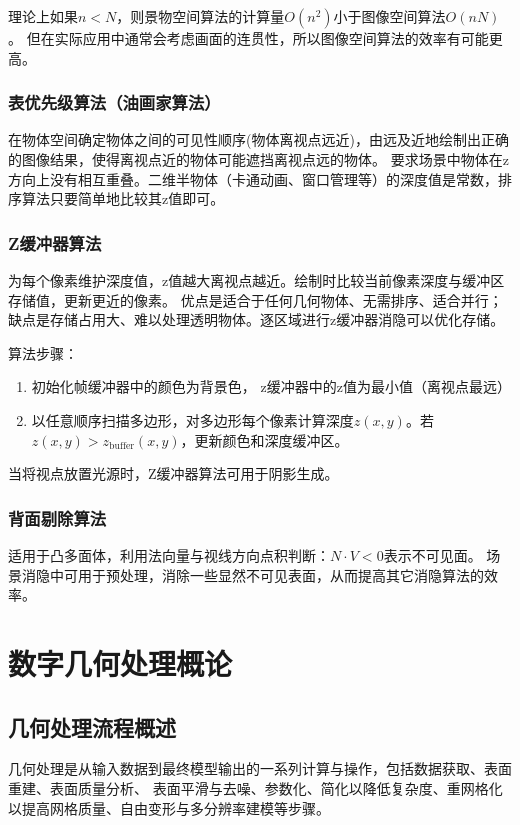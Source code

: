 \documentclass[12pt]{article}
\begin{document}
理论上如果$n<N$，则景物空间算法的计算量$O(n^2)$小于图像空间算法$O(nN)$。
但在实际应用中通常会考虑画面的连贯性，所以图像空间算法的效率有可能更高。

\subsubsection{表优先级算法（油画家算法）}
在物体空间确定物体之间的可见性顺序(物体离视点远近)，由远及近地绘制出正确的图像结果，使得离视点近的物体可能遮挡离视点远的物体。
要求场景中物体在z方向上没有相互重叠。二维半物体（卡通动画、窗口管理等）的深度值是常数，排序算法只要简单地比较其z值即可。

\subsubsection{Z缓冲器算法}
为每个像素维护深度值，z值越大离视点越近。绘制时比较当前像素深度与缓冲区存储值，更新更近的像素。
优点是适合于任何几何物体、无需排序、适合并行；缺点是存储占用大、难以处理透明物体。逐区域进行z缓冲器消隐可以优化存储。

算法步骤：
\begin{enumerate}
    \item 初始化帧缓冲器中的颜色为背景色， z缓冲器中的z值为最小值（离视点最远）
    \item 以任意顺序扫描多边形，对多边形每个像素计算深度$z(x,y)$。若$z(x,y) > z_{\text{buffer}}(x,y)$，更新颜色和深度缓冲区。
\end{enumerate}

当将视点放置光源时，Z缓冲器算法可用于阴影生成。

\subsubsection{背面剔除算法}
适用于凸多面体，利用法向量与视线方向点积判断：$N \cdot V < 0$表示不可见面。
场景消隐中可用于预处理，消除一些显然不可见表面，从而提高其它消隐算法的效率。

\newpage

\section{数字几何处理概论}

\subsection{几何处理流程概述}

几何处理是从输入数据到最终模型输出的一系列计算与操作，包括数据获取、表面重建、表面质量分析、
表面平滑与去噪、参数化、简化以降低复杂度、重网格化以提高网格质量、自由变形与多分辨率建模等步骤。
\end{document}

